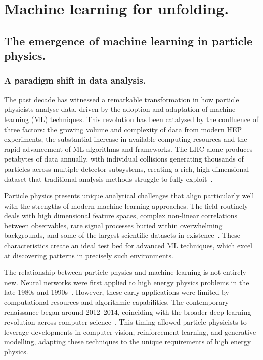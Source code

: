 \chapter{Machine learning for unfolding.}
\label{chap:ml-for-unfolding}
\chapterminitoc

\section{The emergence of machine learning in particle physics.}
\sectionminitoc

\subsection{A paradigm shift in data analysis.}
The past decade has witnessed a remarkable transformation in how particle physicists analyse data, driven by the adoption and adaptation of machine learning (ML) techniques.
%
This revolution has been catalysed by the confluence of three factors: the growing volume and complexity of data from modern HEP experiments, the substantial increase in available computing resources and the rapid advancement of ML algorithms and frameworks.
%
The LHC alone produces petabytes of data annually, with individual collisions generating thousands of particles across multiple detector subsystems, creating a rich, high dimensional dataset that traditional analysis methods struggle to fully exploit~\cite{EnvironmentalCERN}.

Particle physics presents unique analytical challenges that align particularly well with the strengths of modern machine learning approaches.
%
The field routinely deals with high dimensional feature spaces, complex non-linear correlations between observables, rare signal processes buried within overwhelming backgrounds, and some of the largest scientific datasets in existence~\cite{DiMeglio2017SubmitterResearch}.
%
These characteristics create an ideal test bed for advanced ML techniques, which excel at discovering patterns in precisely such environments.
%

The relationship between particle physics and machine learning is not entirely new.
%
Neural networks were first applied to high energy physics problems in the late 1980s and 1990s~\cite{Teodorescu2008ArtificialPhysics}.
%
However, these early applications were limited by computational resources and algorithmic capabilities.
%
The contemporary renaissance began around \numrange{2012}{2014}, coinciding with the broader deep learning revolution across computer science~\cite{TerrenceJ.Sejnowski2018TheIntelligence}.
%
This timing allowed particle physicists to leverage developments in computer vision, reinforcement learning, and generative modelling, adapting these techniques to the unique requirements of high energy physics.

